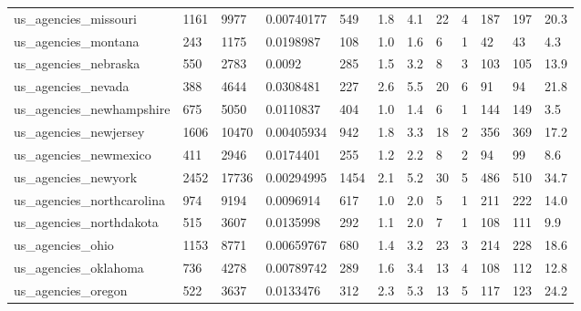 \begin{longtable}{llllllllllll}
 us\_agencies\_missouri                               & 1161       & 9977      & 0.00740177  & 549   & 1.8    & 4.1    & 22    & 4      & 187    & 197    & 20.3    \\
 us\_agencies\_montana                                & 243        & 1175      & 0.0198987   & 108   & 1.0    & 1.6    & 6     & 1      & 42     & 43     & 4.3     \\
 us\_agencies\_nebraska                               & 550        & 2783      & 0.0092      & 285   & 1.5    & 3.2    & 8     & 3      & 103    & 105    & 13.9    \\
 us\_agencies\_nevada                                 & 388        & 4644      & 0.0308481   & 227   & 2.6    & 5.5    & 20    & 6      & 91     & 94     & 21.8    \\
 us\_agencies\_newhampshire                           & 675        & 5050      & 0.0110837   & 404   & 1.0    & 1.4    & 6     & 1      & 144    & 149    & 3.5     \\
 us\_agencies\_newjersey                              & 1606       & 10470     & 0.00405934  & 942   & 1.8    & 3.3    & 18    & 2      & 356    & 369    & 17.2    \\
 us\_agencies\_newmexico                              & 411        & 2946      & 0.0174401   & 255   & 1.2    & 2.2    & 8     & 2      & 94     & 99     & 8.6     \\
 us\_agencies\_newyork                                & 2452       & 17736     & 0.00294995  & 1454  & 2.1    & 5.2    & 30    & 5      & 486    & 510    & 34.7    \\
 us\_agencies\_northcarolina                          & 974        & 9194      & 0.0096914   & 617   & 1.0    & 2.0    & 5     & 1      & 211    & 222    & 14.0    \\
 us\_agencies\_northdakota                            & 515        & 3607      & 0.0135998   & 292   & 1.1    & 2.0    & 7     & 1      & 108    & 111    & 9.9     \\
 us\_agencies\_ohio                                   & 1153       & 8771      & 0.00659767  & 680   & 1.4    & 3.2    & 23    & 3      & 214    & 228    & 18.6    \\
 us\_agencies\_oklahoma                               & 736        & 4278      & 0.00789742  & 289   & 1.6    & 3.4    & 13    & 4      & 108    & 112    & 12.8    \\
 us\_agencies\_oregon                                 & 522        & 3637      & 0.0133476   & 312   & 2.3    & 5.3    & 13    & 5      & 117    & 123    & 24.2    \\

\end{longtable}
